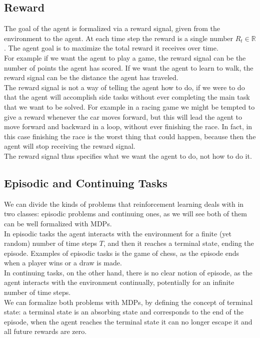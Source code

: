 \subsection{Reward}
The goal of the agent is formalized via a reward signal, given from the environment to the agent. At each time step the reward is a single number $R_t \in \mathbb{R}$. The agent goal is to maximize the total reward it receives over time.\\
For example if we want the agent to play a game, the reward signal can be the number of points the agent has scored. If we want the agent to learn to walk, the reward signal can be the distance the agent has traveled.\\
The reward signal is not a way of telling the agent how to do, if we were to do that the agent will accomplish side tasks without ever completing the main task that we want to be solved. For example in a racing game we might be tempted to give a reward whenever the car moves forward, but this will lead the agent to move forward and backward in a loop, without ever finishing the race. In fact, in this case finishing the race is the worst thing that could happen, because then the agent will stop receiving the reward signal.\\
The reward signal thus specifies what we want the agent to do, not how to do it.

\subsection{Episodic and Continuing Tasks}
We can divide the kinds of problems that reinforcement learning deals with in two classes: episodic problems and continuing ones, as we will see both of them can be well formalized with MDPs.\\
In episodic tasks the agent interacts with the environment for a finite (yet random) number of time steps $T$, and then it reaches a terminal state, ending the episode. Examples of episodic tasks is the game of chess, as the episode ends when a player wins or a draw is made.\\
In continuing tasks, on the other hand, there is no clear notion of episode, as the agent interacts with the environment continually, potentially for an infinite number of time steps.\\
We can formalize both problems with MDPs, by defining the concept of terminal state: a terminal state is an absorbing state and corresponds to the end of the episode, when the agent reaches the terminal state it can no longer escape it and all future rewards are zero.\\


